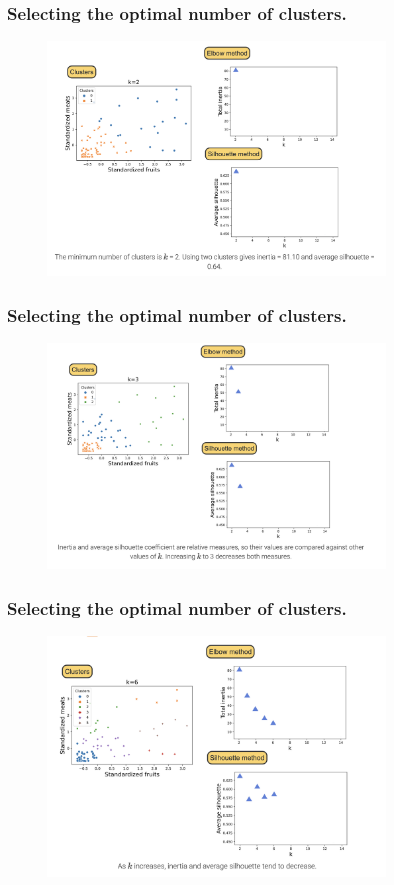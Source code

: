 \documentclass[10pt,dvipsnames]{beamer}
\begin{document}
\begin{frame}
    \frametitle{Selecting the optimal number of clusters.}
    \begin{figure}[ht]
        \centering
        \includegraphics[width=0.8\textwidth]{imgs/k_mean_10.png}
    \end{figure}
\end{frame}

\begin{frame}
    \frametitle{Selecting the optimal number of clusters.}
    \begin{figure}[ht]
        \centering
        \includegraphics[width=0.8\textwidth]{imgs/k_mean_11.png}
    \end{figure}
\end{frame}

\begin{frame}
    \frametitle{Selecting the optimal number of clusters.}
    \begin{figure}[ht]
        \centering
        \includegraphics[width=0.8\textwidth]{imgs/k_mean_12.png}
    \end{figure}
\end{frame}
\end{document}
